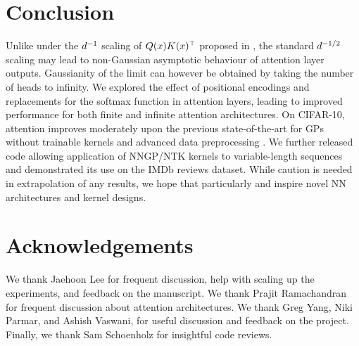 \documentclass{article}
\begin{document}
\section{Conclusion}

Unlike under the $d^{-1}$ scaling of $Q(x) K (x)^\top$ proposed in \citep{yang2019v2}, the standard $d^{-1/2}$ scaling may lead to non-Gaussian asymptotic behaviour of attention layer outputs.
Gaussianity of the limit can however be obtained by taking the number of heads to infinity.
We explored the effect of positional encodings and replacements for the softmax function in attention layers, leading to improved performance for both finite and infinite attention architectures.
On CIFAR-10, attention improves moderately upon the previous state-of-the-art for GPs without trainable kernels and advanced data preprocessing \citep{li2019enhanced}.
We further released code allowing application of NNGP/NTK kernels to variable-length sequences and demonstrated its use on the IMDb reviews dataset.
While caution is needed in extrapolation of any results, we hope that particularly  and  inspire novel NN architectures and kernel designs.

\section*{Acknowledgements}
    We thank Jaehoon Lee for frequent discussion, help with scaling up the experiments, and feedback on the manuscript. We thank Prajit Ramachandran for frequent discussion about attention architectures. We thank Greg Yang, Niki Parmar, and Ashish Vaswani, for useful discussion and feedback on the project. Finally, we thank Sam Schoenholz for insightful code reviews.






\end{document}
